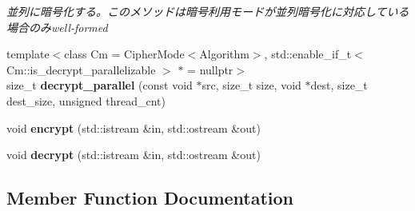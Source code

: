 \begin{DoxyCompactItemize}
\begin{DoxyCompactList}\small\item\em 並列に暗号化する。このメソッドは暗号利用モードが並列暗号化に対応している場合のみwell-\/formed \end{DoxyCompactList}\item 
\mbox{\label{classouchi_1_1crypto_1_1block__encoder_aa89183c9c430b437d066667e9bb22807}} 
{\footnotesize template$<$class Cm  = Cipher\+Mode$<$\+Algorithm$>$, std\+::enable\+\_\+if\+\_\+t$<$ Cm\+::is\+\_\+decrypt\+\_\+parallelizable $>$ $\ast$  = nullptr$>$ }\\size\+\_\+t {\bfseries decrypt\+\_\+parallel} (const void $\ast$src, size\+\_\+t size, void $\ast$dest, size\+\_\+t dest\+\_\+size, unsigned thread\+\_\+cnt)
\item 
\mbox{\label{classouchi_1_1crypto_1_1block__encoder_a12847cbf8836b8476d72201c64ed0d81}} 
void {\bfseries encrypt} (std\+::istream \&in, std\+::ostream \&out)
\item 
\mbox{\label{classouchi_1_1crypto_1_1block__encoder_a6c15c5b38a194ad5bd232b0f19a03c6d}} 
void {\bfseries decrypt} (std\+::istream \&in, std\+::ostream \&out)
\end{DoxyCompactItemize}


\subsection{Member Function Documentation}
\mbox{\label{classouchi_1_1crypto_1_1block__encoder_a6db3aa2fb1fd0936a66cdb0eeb19387b}} 
